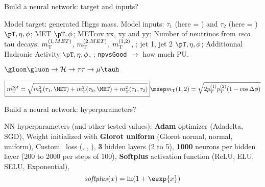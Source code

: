 \begin{frame}{Build a neural network: target and inputs?}

\begin{minipage}[c]{.49\textwidth}
\manip Model target: generated Higgs mass.
\manip Model inputs:
\submanip $\tau_1$ (here = \muon) and $\tau_2$ (here = \tauh) $\pT, \eta, \phi$;
\submanip MET $\pT, \phi$;
\submanip METcov xx, xy and yy;
\submanip Number of neutrinos from \emph{reco} tau decays;
\submanip $m_{\mathrm{T}}^{(1,MET)}$, $m_{\mathrm{T}}^{(2,MET)}$, $m_{\mathrm{T}}^{(1,2)}$, \mTtot;
\submanip jet 1, jet 2 $\pT, \eta, \phi$;
\submanip Additionnal Hadronic Activity $\pT, \eta, \phi$, \Njetsr;
\submanip \texttt{npvsGood} $\rightarrow$ how much PU.
\end{minipage}
\hfill
\begin{minipage}[c]{.48\textwidth}
\begin{block}{$\gluon\gluon\to\Higgs\to\tau\tau\to\mu\tauh$}
\begin{center}

\vspace{2\baselineskip}



\vspace{2\baselineskip}

\end{center}
\end{block}
\end{minipage}

\vfill

\begin{equation*}
\boxed{\mTtot = \sqrt{\mT^2(\tau_1,\MET) + \mT^2(\tau_2,\MET) + \mT^2(\tau_1,\tau_2)}}
\msep
\mT(1,2) = \sqrt{2p_T^{(1)} p_T^{(2)} (1-\cos\Delta\phi)}
\end{equation*}

\end{frame}

\begin{frame}{Build a neural network: hyperparameters?}

\manip NN hyperparameters (and other tested values):
\submanip \textbf{Adam} optimizer (Adadelta, SGD),
\submanip Weight initialized with \textbf{Glorot uniform} (Glorot normal, normal, uniform),
\submanip Custom \LossMAPEsqrtb\ loss (\LossMAPE, \LossMAE, \LossMSE),
\submanip \textbf{3} hidden layers (2 to 5),
\submanip \textbf{1000} neurons per hidden layer (200 to 2000 per steps of 100),
\submanip \textbf{Softplus} activation function (ReLU, ELU, SELU, Exponential),
\begin{equation*}
\mathit{softplus}(x) = \ln(1+\eexp{x})
\end{equation*}
\end{frame}

